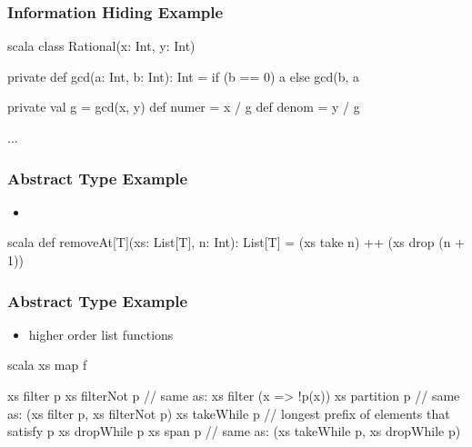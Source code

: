 \documentclass[dvipsnames]{beamer}
\theoremstyle{plain}
\begin{document}
\begin{frame}[fragile]
  \frametitle{Information Hiding Example}

  \begin{example}[Scala]
    \begin{pygments}{scala}
class Rational(x: Int, y: Int) {
    private def gcd(a: Int, b: Int): Int =
        if (b == 0) a else gcd(b, a %

    private val g = gcd(x, y)
    def numer = x / g
    def denom = y / g

    ...
}
    \end{pygments}
  \end{example}
\end{frame}

\begin{frame}[fragile]
  \frametitle{Abstract Type Example}

  \begin{example}
    \begin{itemize}
      \item {}
    \end{itemize}

    \pause
    \begin{pygments}{scala}
def removeAt[T](xs: List[T], n: Int): List[T] =
    (xs take n) ++ (xs drop (n + 1))
    \end{pygments}
  \end{example}
\end{frame}

\begin{frame}[fragile]
  \frametitle{Abstract Type Example}

  \begin{example}
    \begin{itemize}
      \item higher order list functions
    \end{itemize}

    \begin{pygments}{scala}
xs map f

xs filter p
xs filterNot p  // same as: xs filter (x => !p(x))
xs partition p  // same as: (xs filter p, xs filterNot p)
xs takeWhile p  // longest prefix of elements that satisfy p
xs dropWhile p
xs span p       // same as: (xs takeWhile p, xs dropWhile p)
    \end{pygments}
  \end{example}
\end{frame}
\end{document}
